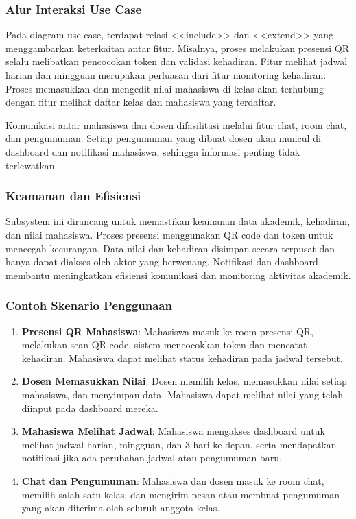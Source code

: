 \documentclass[a4paper,oneside,11pt]{book}
\begin{document}
\subsubsection{Alur Interaksi Use Case}

Pada diagram use case, terdapat relasi <<include>> dan <<extend>> yang menggambarkan keterkaitan antar fitur. Misalnya, proses melakukan presensi QR selalu melibatkan pencocokan token dan validasi kehadiran. Fitur melihat jadwal harian dan mingguan merupakan perluasan dari fitur monitoring kehadiran. Proses memasukkan dan mengedit nilai mahasiswa di kelas akan terhubung dengan fitur melihat daftar kelas dan mahasiswa yang terdaftar.

Komunikasi antar mahasiswa dan dosen difasilitasi melalui fitur chat, room chat, dan pengumuman. Setiap pengumuman yang dibuat dosen akan muncul di dashboard dan notifikasi mahasiswa, sehingga informasi penting tidak terlewatkan.

\subsubsection{Keamanan dan Efisiensi}

Subsystem ini dirancang untuk memastikan keamanan data akademik, kehadiran, dan nilai mahasiswa. Proses presensi menggunakan QR code dan token untuk mencegah kecurangan. Data nilai dan kehadiran disimpan secara terpusat dan hanya dapat diakses oleh aktor yang berwenang. Notifikasi dan dashboard membantu meningkatkan efisiensi komunikasi dan monitoring aktivitas akademik.

\subsubsection{Contoh Skenario Penggunaan}

\begin{enumerate}
  \item \textbf{Presensi QR Mahasiswa}: Mahasiswa masuk ke room presensi QR, melakukan scan QR code, sistem mencocokkan token dan mencatat kehadiran. Mahasiswa dapat melihat status kehadiran pada jadwal tersebut.
  \item \textbf{Dosen Memasukkan Nilai}: Dosen memilih kelas, memasukkan nilai setiap mahasiswa, dan menyimpan data. Mahasiswa dapat melihat nilai yang telah diinput pada dashboard mereka.
  \item \textbf{Mahasiswa Melihat Jadwal}: Mahasiswa mengakses dashboard untuk melihat jadwal harian, mingguan, dan 3 hari ke depan, serta mendapatkan notifikasi jika ada perubahan jadwal atau pengumuman baru.
  \item \textbf{Chat dan Pengumuman}: Mahasiswa dan dosen masuk ke room chat, memilih salah satu kelas, dan mengirim pesan atau membuat pengumuman yang akan diterima oleh seluruh anggota kelas.
\end{enumerate}
\end{document}

